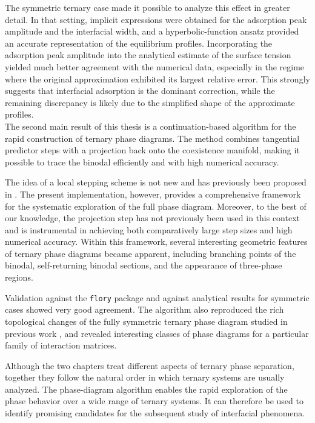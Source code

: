\documentclass[12pt]{article}
\begin{document}
The symmetric ternary case made it possible to analyze this effect in greater detail. In that setting, implicit expressions were obtained for the adsorption peak amplitude and the interfacial width, and a hyperbolic-function ansatz provided an accurate representation of the equilibrium profiles. Incorporating the adsorption peak amplitude into the analytical estimate of the surface tension yielded much better agreement with the numerical data, especially in the regime where the original approximation exhibited its largest relative error. This strongly suggests that interfacial adsorption is the dominant correction, while the remaining discrepancy is likely due to the simplified shape of the approximate profiles.\\

The second main result of this thesis is a continuation-based algorithm for the rapid construction of ternary phase diagrams. The method combines tangential predictor steps with a projection back onto the coexistence manifold, making it possible to trace the binodal efficiently and with high numerical accuracy.

The idea of a local stepping scheme is not new and has previously been proposed in \cite{Shcherbakova2023}. The present implementation, however, provides a comprehensive framework for the systematic exploration of the full phase diagram. Moreover, to the best of our knowledge, the projection step has not previously been used in this context and is instrumental in achieving both comparatively large step sizes and high numerical accuracy. Within this framework, several interesting geometric features of ternary phase diagrams became apparent, including branching points of the binodal, self-returning binodal sections, and the appearance of three-phase regions.


Validation against the \texttt{flory} package \cite{Yicheng2025flory} and against analytical results for symmetric cases showed very good agreement. The algorithm also reproduced the rich topological changes of the fully symmetric ternary phase diagram studied in previous work \cite{Huang1995PhaseSeparation}, and revealed interesting classes of phase diagrams for a particular family of interaction matrices.


Although the two chapters treat different aspects of ternary phase separation, together they follow the natural order in which ternary systems are usually analyzed. The phase-diagram algorithm enables the rapid exploration of the phase behavior over a wide range of ternary systems. It can therefore be used to identify promising candidates for the subsequent study of interfacial phenomena.\\
\end{document}
